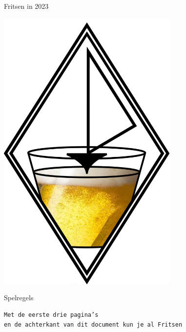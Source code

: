 \thispagestyle{empty}
\begingroup
    \fontsize{80pt}{82pt}\selectfont
    \begin{center}
        Fritsen in 2023  
    \end{center}
\endgroup

\vspace{0.05cm}

\begingroup
    \fontsize{26pt}{28pt}\selectfont
    \begin{center}
    \end{center}
\endgroup


\begin{center}
    \includegraphics[width=9cm]{bier_2.jpg}
\end{center}

\begingroup
    \fontsize{80pt}{82pt}\selectfont
    \begin{center}
        Spelregels  
    \end{center}
\endgroup

\vspace{0.1cm}

\begingroup
    \fontsize{30pt}{32pt}\selectfont
    \begin{center}
        \texttt{Met de eerste drie pagina's \\en de achterkant van dit document kun je al Fritsen}
    \end{center}
\endgroup

\newpage